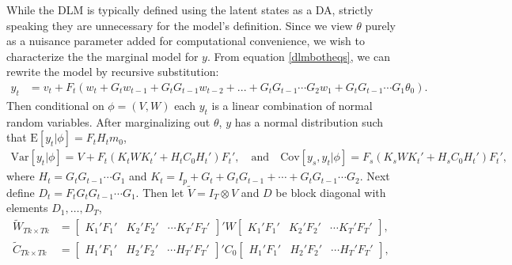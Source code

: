 \documentclass[12pt]{article}
\begin{document}
While the DLM is typically defined using the latent states as a DA, strictly speaking they are unnecessary for the model's definition. Since we view $\theta$ purely as a nuisance parameter added for computational convenience, we wish to characterize the the marginal model for $y$. From equation \eqref{dlmbotheqs}, we can rewrite the model by recursive substitution:
\begin{align*}
  y_t &= v_t + F_t\left(w_t + G_tw_{t-1} + G_tG_{t-1}w_{t-2} + ... + G_tG_{t-1}\cdots G_{2}w_1 + G_tG_{t-1}\cdots G_1\theta_0\right).
\end{align*}
Then conditional on $\phi=(V,W)$ each $y_t$ is a linear combination of normal random variables. After marginalizing out $\theta$, $y$ has a normal distribution such that $\mathrm{E}[y_t|\phi] =  F_tH_tm_0$,
\begin{align*}
  \mathrm{Var}[y_t|\phi] =  V + F_t(K_tWK_t' + H_tC_0H_t')F_t' ,\quad \mathrm{and} \quad
  \mathrm{Cov}[y_s,y_t|\phi] = F_s(K_sWK_t' + H_sC_0H_t')F_t',
\end{align*}
where $H_t = G_tG_{t-1}\cdots G_1$ and $K_t = I_p + G_t + G_tG_{t-1} + \cdots + G_tG_{t-1}\cdots G_2$. Next define $D_t = F_tG_tG_{t-1}\cdots G_1$. Then let $\tilde{V}=I_T\otimes V$ and $D$ be block diagonal with elements $D_1,\ldots,D_T$, 
\begin{align*}
\tilde{W}_{Tk\times Tk} &= \begin{bmatrix} K_1'F_1' & K_2'F_2' & \cdots K_T'F_T' \end{bmatrix}' W \begin{bmatrix} K_1'F_1' & K_2'F_2' & \cdots K_T'F_T' \end{bmatrix}, &\\
\tilde{C}_{Tk\times Tk} &= \begin{bmatrix} H_1'F_1' & H_2'F_2' & \cdots H_T'F_T' \end{bmatrix}' C_0 \begin{bmatrix} H_1'F_1' & H_2'F_2' & \cdots H_T'F_T' \end{bmatrix},&
\end{align*}
\end{document}
